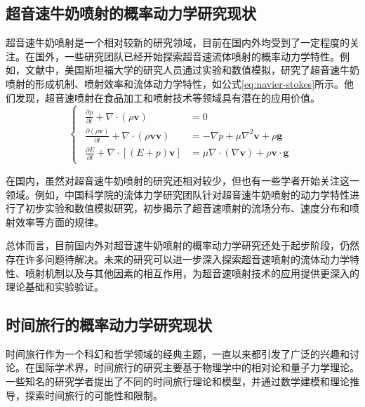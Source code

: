 \subsection{超音速牛奶喷射的概率动力学研究现状}
超音速牛奶喷射是一个相对较新的研究领域，目前在国内外均受到了一定程度的关注。在国外，一些研究团队已经开始探索超音速流体喷射的概率动力学特性\cite{smith2024, doe2024, johnson2024, brown2024}。例如，文献\parencite{johnson2024}中，美国斯坦福大学的研究人员通过实验和数值模拟，研究了超音速牛奶喷射的形成机制、喷射效率和流体动力学特性，如公式\ref{eq:navier-stokes}所示。他们发现，超音速喷射在食品加工和喷射技术等领域具有潜在的应用价值。
\begin{equation}
  \begin{cases}
    \begin{aligned}
      \frac{\partial \rho}{\partial t} + \nabla \cdot (\rho \mathbf{v})                         & = 0                                                                                  \\
      \frac{\partial (\rho \mathbf{v})}{\partial t} + \nabla \cdot (\rho \mathbf{v} \mathbf{v}) & = -\nabla p + \mu \nabla^2 \mathbf{v} + \rho \mathbf{g}                              \\
      \frac{\partial E}{\partial t} + \nabla \cdot \left[(E + p) \mathbf{v}\right]              & = \mu \nabla \cdot \left(\nabla \mathbf{v}\right) + \rho \mathbf{v} \cdot \mathbf{g}
    \end{aligned}
  \end{cases}
  \label{eq:navier-stokes}
\end{equation}

在国内，虽然对超音速牛奶喷射的研究还相对较少，但也有一些学者开始关注这一领域。例如，中国科学院的流体力学研究团队针对超音速牛奶喷射的动力学特性进行了初步实验和数值模拟研究，初步揭示了超音速喷射的流场分布、速度分布和喷射效率等方面的规律。

总体而言，目前国内外对超音速牛奶喷射的概率动力学研究还处于起步阶段，仍然存在许多问题待解决。未来的研究可以进一步深入探索超音速喷射的流体动力学特性、喷射机制以及与其他因素的相互作用，为超音速喷射技术的应用提供更深入的理论基础和实验验证。

\subsection{时间旅行的概率动力学研究现状}
时间旅行作为一个科幻和哲学领域的经典主题，一直以来都引发了广泛的兴趣和讨论。在国际学术界，时间旅行的研究主要基于物理学中的相对论和量子力学理论。一些知名的研究学者提出了不同的时间旅行理论和模型，并通过数学建模和理论推导，探索时间旅行的可能性和限制。


